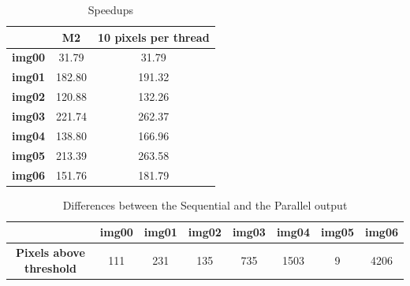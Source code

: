 \documentclass[a4paper]{article}
\begin{document}
\begin{table}[!ht]
\centering
\label{darker_sp}
\begin{tabular}{|c|c|c|}
\hline
               & \textbf{M2} & \textbf{10 pixels per thread} \\ \hline
\textbf{img00} & 31.79       & 31.79                         \\ \hline
\textbf{img01} & 182.80      & 191.32                        \\ \hline
\textbf{img02} & 120.88      & 132.26                        \\ \hline
\textbf{img03} & 221.74      & 262.37                        \\ \hline
\textbf{img04} & 138.80      & 166.96                        \\ \hline
\textbf{img05} & 213.39      & 263.58                        \\ \hline
\textbf{img06} & 151.76      & 181.79                        \\ \hline
\end{tabular}
\caption{Speedups}
\end{table}
\FloatBarrier

\begin{table}[!ht]
\centering
\label{pxabd}
\begin{tabular}{|c|l|c|c|l|l|l|l|}
\hline
\textbf{}                        & \textbf{img00}           & \textbf{img01} & \textbf{img02} & \textbf{img03}           & \textbf{img04}            & \textbf{img05}         & \textbf{img06}            \\ \hline
\textbf{Pixels above  threshold} & \multicolumn{1}{c|}{111} & 231            & 135            & \multicolumn{1}{c|}{735} & \multicolumn{1}{c|}{1503} & \multicolumn{1}{c|}{9} & \multicolumn{1}{c|}{4206} \\ \hline
\end{tabular}
\caption{Differences between the Sequential and the Parallel output}
\end{table}
\end{document}
